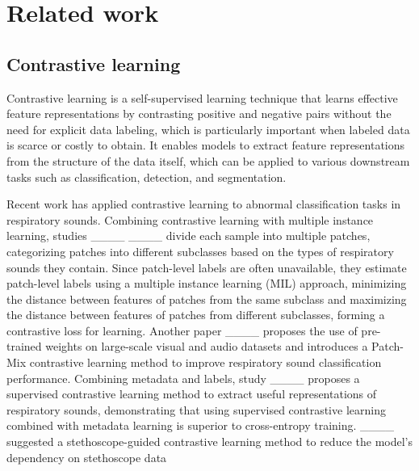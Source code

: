 \section{Related work}
\subsection{Contrastive learning}

Contrastive learning is a self-supervised learning technique that learns effective feature representations by contrasting positive and negative pairs without the need for explicit data labeling, which is particularly important when labeled data is scarce or costly to obtain. It enables models to extract feature representations from the structure of the data itself, which can be applied to various downstream tasks such as classification, detection, and segmentation.

Recent work has applied contrastive learning to abnormal classification tasks in respiratory sounds. Combining contrastive learning with multiple instance learning, studies ____ ____ divide each sample into multiple patches, categorizing patches into different subclasses based on the types of respiratory sounds they contain. Since patch-level labels are often unavailable, they estimate patch-level labels using a multiple instance learning (MIL) approach, minimizing the distance between features of patches from the same subclass and maximizing the distance between features of patches from different subclasses, forming a contrastive loss for learning. Another paper ____  proposes the use of pre-trained weights on large-scale visual and audio datasets and introduces a Patch-Mix contrastive learning method to improve respiratory sound classification performance. Combining metadata and labels, study ____ proposes a supervised contrastive learning method to extract useful representations of respiratory sounds, demonstrating that using supervised contrastive learning combined with metadata learning is superior to cross-entropy training. ____ suggested a stethoscope-guided contrastive learning method to reduce the model's dependency on stethoscope data



